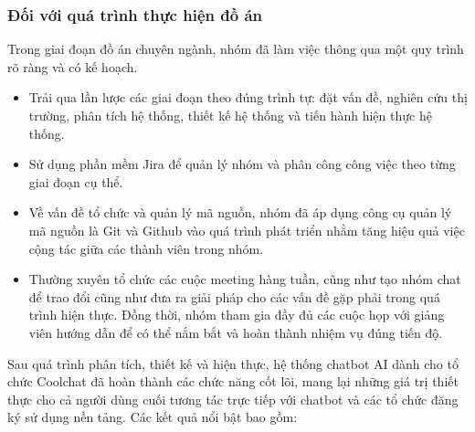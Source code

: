 \subsubsection{Đối với quá trình thực hiện đồ án}
Trong giai đoạn đồ án chuyên ngành, nhóm đã làm việc thông qua một quy trình rõ ràng và có kế hoạch.
\begin{itemize}
    \item Trải qua lần lược các giai đoạn theo đúng trình tự: đặt vấn đề, nghiên cứu thị trường, phân tích hệ thống, thiết kế hệ thống và tiến hành hiện thực hệ thống.
    \item Sử dụng phần mềm Jira để quản lý nhóm và phân công công việc theo từng giai đoạn cụ thể.
    \item Về vấn đề tổ chức và quản lý mã nguồn, nhóm đã áp dụng công cụ quản lý mã nguồn là Git
    và Github vào quá trình phát triển nhằm tăng hiệu quả việc cộng tác giữa các thành viên trong
    nhóm.
    \item Thường xuyên tổ chức các cuộc meeting hàng tuần, cũng như tạo nhóm chat để trao đổi cũng như đưa ra giải pháp cho các vấn đề gặp phải trong quá trình hiện thực. Đồng thời, nhóm tham gia đầy đủ các cuộc họp với giảng viên hướng dẫn để có thể nắm bắt và hoàn thành nhiệm vụ đúng tiến độ.
\end{itemize}

\vspace{\baselineskip}
Sau quá trình phân tích, thiết kế và hiện thực, hệ thống chatbot AI dành cho tổ chức Coolchat đã hoàn thành các chức năng cốt lõi, mang lại những giá trị thiết thực cho cả người dùng cuối tương tác trực tiếp với chatbot và các tổ chức đăng ký sử dụng nền tảng. Các kết quả nổi bật bao gồm:\\

